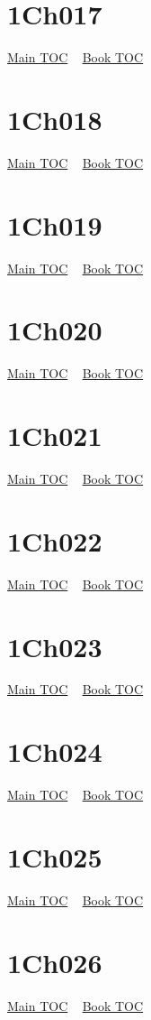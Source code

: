 \documentclass{book}
\begin{document}
  \section{1Ch017}\hyperlink{toc}{Main TOC} ~ \hyperref[subsec:1Ch]{Book TOC} 
  \section{1Ch018}\hyperlink{toc}{Main TOC} ~ \hyperref[subsec:1Ch]{Book TOC} 
  \section{1Ch019}\hyperlink{toc}{Main TOC} ~ \hyperref[subsec:1Ch]{Book TOC} 
  \section{1Ch020}\hyperlink{toc}{Main TOC} ~ \hyperref[subsec:1Ch]{Book TOC} 
  \section{1Ch021}\hyperlink{toc}{Main TOC} ~ \hyperref[subsec:1Ch]{Book TOC} 
  \section{1Ch022}\hyperlink{toc}{Main TOC} ~ \hyperref[subsec:1Ch]{Book TOC} 
  \section{1Ch023}\hyperlink{toc}{Main TOC} ~ \hyperref[subsec:1Ch]{Book TOC} 
  \section{1Ch024}\hyperlink{toc}{Main TOC} ~ \hyperref[subsec:1Ch]{Book TOC} 
  \section{1Ch025}\hyperlink{toc}{Main TOC} ~ \hyperref[subsec:1Ch]{Book TOC} 
  \section{1Ch026}\hyperlink{toc}{Main TOC} ~ \hyperref[subsec:1Ch]{Book TOC} 
\end{document}
